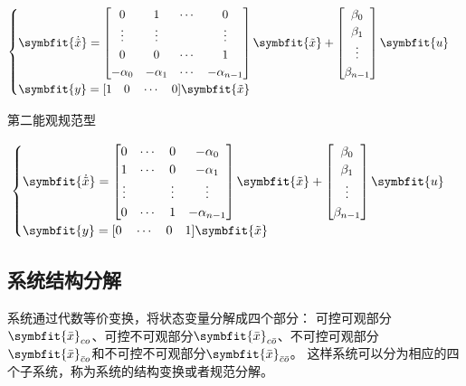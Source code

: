 \documentclass[11pt,a4paper]{ctexart}
\newcommand{\bm}{\symbfit}
\begin{document}
            \[
            \begin{cases}
            \bm{\dot{\tilde x}}=\begin{bmatrix}
                0 & 1 & \cdots & 0 \\
                \vdots & \vdots &  & \vdots \\
                0 & 0 & \cdots & 1 \\
                -\alpha_0 & -\alpha_1 & \cdots & -\alpha_{n-1} \\
            \end{bmatrix}\bm{\tilde{x}}+\begin{bmatrix}\beta_0\\ \beta_1\\ \vdots \\ \beta_{n-1}\end{bmatrix}\bm{u}\\
            \bm{y}=[1\quad0\quad\cdots\quad0]\bm{\tilde{x}}
            \end{cases}
            \]

            第二能观规范型

            \[
            \begin{cases}
            \bm{\dot{\tilde x}}=\begin{bmatrix}
                0 & \cdots & 0 & -\alpha_0 \\
                1 & \cdots & 0 & -\alpha_1 \\
                \vdots &  & \vdots & \vdots \\
                0 & \cdots & 1 & -\alpha_{n-1} \\
            \end{bmatrix}\bm{\tilde{x}}+\begin{bmatrix}\beta_0\\ \beta_1\\ \vdots \\ \beta_{n-1}\end{bmatrix}\bm{u}\\
            \bm{y}=[0\quad\cdots\quad0\quad1]\bm{\tilde{x}}
            \end{cases}
            \]
    \subsection{系统结构分解}
        系统通过代数等价变换，将状态变量分解成四个部分：
        可控可观部分$\bm{\bar x}_{co}$、可控不可观部分$\bm{\bar x}_{c\bar o}$、不可控可观部分$\bm{\bar x}_{\bar c o}$和不可控不可观部分$\bm{\bar x}_{\bar c\bar o}$。
        这样系统可以分为相应的四个子系统，称为系统的结构变换或者规范分解。
\end{document}
